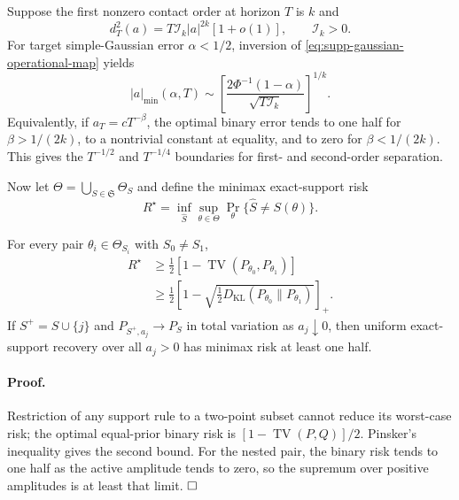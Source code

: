 Suppose the first nonzero contact order at horizon $T$ is $k$ and
\begin{equation}
 d_T^2(a)=T\mathcal I_k|a|^{2k}[1+o(1)],\qquad \mathcal I_k>0.
 \label{eq:supp-order-k-information-rate}
\end{equation}
For target simple-Gaussian error $\alpha<1/2$, inversion of
\eqref{eq:supp-gaussian-operational-map} yields
\begin{equation}
 |a|_{\min}(\alpha,T)\sim
 \left[\frac{2\Phi^{-1}(1-\alpha)}
 {\sqrt{T\mathcal I_k}}\right]^{1/k}.
 \label{eq:supp-order-k-resolution}
\end{equation}
Equivalently, if $a_T=cT^{-\beta}$, the optimal binary error tends to one half
for $\beta>1/(2k)$, to a nontrivial constant at equality, and to zero for
$\beta<1/(2k)$. This gives the $T^{-1/2}$ and $T^{-1/4}$ boundaries for
first- and second-order separation.

Now let $\Theta=\bigcup_{S\in\mathfrak S}\Theta_S$ and define the minimax
exact-support risk
\begin{equation}
 R^\star=\inf_{\widehat S}\sup_{\theta\in\Theta}
 \Pr_\theta\{\widehat S\ne S(\theta)\}.
 \label{eq:supp-minimax-support-risk}
\end{equation}

\begin{theorem}
For every pair $\theta_i\in\Theta_{S_i}$ with $S_0\ne S_1$,
\begin{equation}
 \begin{aligned}
 R^\star&\ge\frac12[1-\operatorname{TV}(P_{\theta_0},P_{\theta_1})]\\
 &\ge\frac12\left[1-
 \sqrt{\tfrac12D_{\mathrm{KL}}(P_{\theta_0}\|P_{\theta_1})}
 \right]_+.
 \end{aligned}
 \label{eq:supp-binary-minimax-bound}
\end{equation}
If $S^+=S\cup\{j\}$ and
$P_{S^+,a_j}\to P_S$ in total variation as $a_j\downarrow0$, then uniform
exact-support recovery over all $a_j>0$ has minimax risk at least one half.
\label{thm:supp-beta-min}
\end{theorem}

\paragraph{Proof.}
Restriction of any support rule to a two-point subset cannot reduce its
worst-case risk; the optimal equal-prior binary risk is
$[1-\operatorname{TV}(P,Q)]/2$. Pinsker's inequality gives the second bound.
For the nested pair, the binary risk tends to one half as the active amplitude
tends to zero, so the supremum over positive amplitudes is at least that limit.
$\hfill\square$

